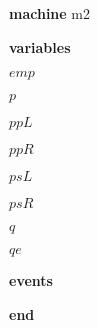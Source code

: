 \begin{block}
  \item   \textbf{machine} m2
  \item   \textbf{variables}
  \begin{block}
    \item   $emp$
    \item   $p$
    \item   $ppL$
    \item   $ppR$
    \item   $psL$
    \item   $psR$
    \item   $q$
    \item   $qe$
  \end{block}
  \item   \textbf{events}
  \begin{block}
    \item   
    \item   
    \item   
    \item   
    \item   
    \item   
    \item   
    \item   
    \item   
    \item   
  \end{block}
  \item   \textbf{end} \\
\end{block}

